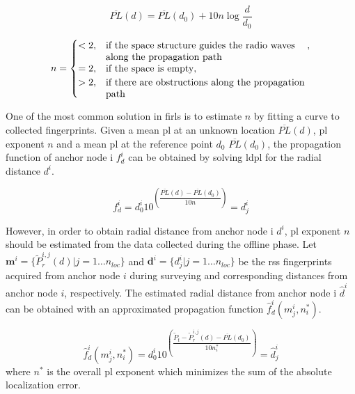     \begin{equation}
        \label{eq:log-distance}
        \overline{PL}(d) = \overline{PL}(d_0) + 10 n \log{\dfrac{d}{d_0}}
    \end{equation}

    \begin{equation}
        n =
        \begin{cases}
            <2,& \parbox[t]{.6\textwidth}{if the space structure guides the radio waves\\
                                        along the propagation path}, \\
            =2,& \text{if the space is empty}, \\
            >2,& \parbox[t]{.6\textwidth}{if there are obstructions along the propagation\\
                                        path}
        \end{cases}
    \end{equation}

    One of the most common solution in \gls{firl}s is to estimate $n$ by fitting a curve to collected fingerprints.
    Given a mean \gls{pl} at an unknown location $\overline{PL}(d)$, \gls{pl} exponent $n$ and a mean \gls{pl} at the reference point $d_0$ $\overline{PL}(d_0)$, the propagation function of anchor node i $f^i_{d}$ can be obtained by solving \gls{ldpl} for the radial distance $d^i$.

    \begin{equation}
      \label{eq:log-distance-d}
      f^i_{d} = d^i_0 10^{\left(\dfrac{\overline{PL}(d)-\overline{PL}(d_0)}{10 n} \right)} = d^i_j
    \end{equation}


    However, in order to obtain radial distance from anchor node i $d^i$, \gls{pl} exponent $n$ should be estimated from the data collected during the offline phase.
    Let $\bm{m}^i = \{\widetilde{P}_r^{i,j}(d) | j=1 \ldots n_{loc} \}$ and $\bm{d}^i = \{ d^i_j | j = 1 \ldots n_{loc}\}$ be the \gls{rss} fingerprints acquired from anchor node $i$ during surveying and corresponding distances from anchor node $i$, respectively.
    The estimated radial distance from anchor node i $\hat{d}^i$ can be obtained with an approximated propagation function $\hat{f}^i_d(m^i_j, n_i^*)$.

    \begin{equation}
      \label{eq:log-distance-d-app}
      \hat{f}^i_d(m^i_j, n_i^*) = d^i_0 10^{\left(\dfrac{\widetilde{P}_t - \widetilde{P}_r^{i,j}(d) - \overline{PL}(d_0)}{10 n_i^*} \right)} = \hat{d}^i_j
    \end{equation}
    where $n^*$ is the overall \gls{pl} exponent which minimizes the sum of the absolute localization error.

